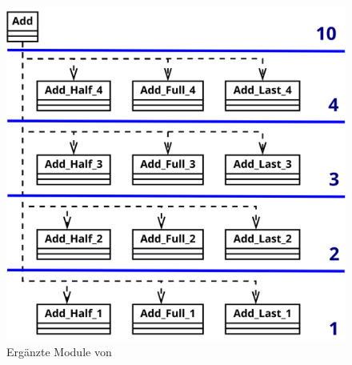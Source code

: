 \begin{figure}[!h]
  \centering
  \includegraphics[scale=0.265]{images/module_add}
  \caption{Ergänzte Module von }
  \label{fig:sha256_module_add}
\end{figure}



